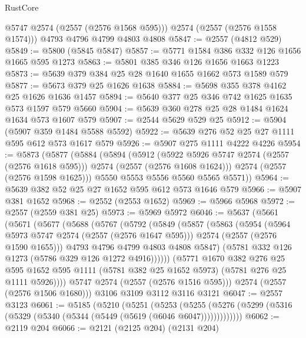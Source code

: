 \begin{lexlean}{RustCore}
\begin{coremodule}
        @5747
        @2574
        (@2557 (@2576 @1568 @595)))
      @2574
      (@2557 (@2576 @1558 @1574)))
    @4793
    @4796
    @4799
    @4803
    @4808
@5847 := @2557 (@4812 @529)
@5849 := @5800 (@5845 @5847)
@5857 := @5771 @1584 @386 @332 @126 @1656 @1665 @595 @1273
@5863 := @5801 @385 @346 @126 @1656 @1663 @1223
@5873 := @5639 @379 @384 @25 @28 @1640 @1655 @1662 @573 @1589 @579
@5877 := @5673 @379 @25 @1626 @1638
@5884 := @5698 @355 @378 @4162 @25 @1626 @1636 @1457
@5894 := @5640 @377 @25 @346 @742 @1625 @1635 @573 @1597 @579 @5660
@5904 := @5639 @360 @278 @25 @28 @1484 @1624 @1634 @573 @1607 @579
@5907 := @2544 @5629 @529 @25
@5912 := @5904 (@5907 @359 @1484 @5588 @5592)
@5922 := @5639 @276 @52 @25 @27 @1111 @595 @612 @573 @1617 @579
@5926 := @5907 @275 @1111 @4222 @4226
@5954 := @5873
    (@5877
      (@5884
        (@5894
          (@5912
            (@5922 @5926 @5747 @2574 (@2557 (@2576 @1618 @595)))
            @2574
            (@2557 (@2576 @1608 @1624)))
          @2574
          (@2557 (@2576 @1598 @1625)))
        @5550
        @5553
        @5556
        @5560
        @5565
        @5571))
@5964 := @5639 @382 @52 @25 @27 @1652 @595 @612 @573 @1646 @579
@5966 := @5907 @381 @1652
@5968 := @2552 (@2553 @1652)
@5969 := @5966 @5968
@5972 := @2557 (@2559 @381 @25)
@5973 := @5969 @5972
@6046 := @5637
    (@5661
      (@5671
        (@5677
          (@5688
            (@5767
              (@5792
                (@5849
                  (@5857
                    (@5863
                      (@5954
                        (@5964 @5973 @5747 @2574 (@2557 (@2576 @1647 @595)))
                        @2574
                        (@2557 (@2576 @1590 @1655)))
                      @4793
                      @4796
                      @4799
                      @4803
                      @4808
                      @5847)
                    (@5781 @332 @126 @1273 (@5786 @329 @126 @1272 @4916))))))
            (@5771
              @1670
              @382
              @276
              @25
              @595
              @1652
              @595
              @1111
              (@5781 @382 @25 @1652 @5973)
              (@5781 @276 @25 @1111 @5926))))
        @5747
        @2574
        (@2557 (@2576 @1516 @595)))
      @2574
      (@2557 (@2576 @1506 @1680)))
    @3106
    @3109
    @3112
    @3116
    @3121
@6047 := @2557 @3123
@6061 := @5185
    (@5210
      (@5251
        (@5253
          (@5255 (@5276 (@5299 (@5316 (@5329 (@5340 (@5344 (@5449 (@5619 (@6046 @6047)))))))))))))
@6062 := @2119 @204
@6066 := @2121 (@2125 @204) (@2131 @204)

\end{coremodule}
\end{lexlean}

